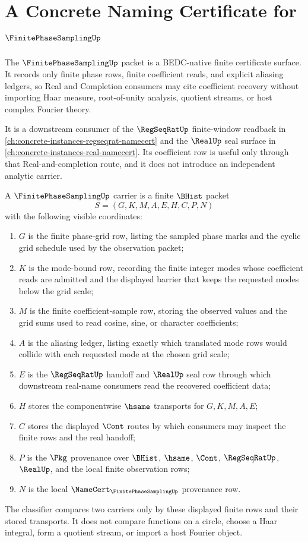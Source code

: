 \chapter{A Concrete Naming Certificate for $\FinitePhaseSamplingUp$}
\label{ch:concrete-instances-finite-phase-sampling-namecert}

The $\FinitePhaseSamplingUp$ packet is a BEDC-native finite certificate surface. It records only finite phase rows, finite coefficient reads, and explicit aliasing ledgers, so Real and Completion consumers may cite coefficient recovery without importing Haar measure, root-of-unity analysis, quotient streams, or host complex Fourier theory.

It is a downstream consumer of the $\RegSeqRatUp$ finite-window readback in \autoref{ch:concrete-instances-regseqrat-namecert} and the $\RealUp$ seal surface in \autoref{ch:concrete-instances-real-namecert}. Its coefficient row is useful only through that Real-and-completion route, and it does not introduce an independent analytic carrier.

\begin{definition}
\label{def:finite-phase-sampling-carrier}
A $\FinitePhaseSamplingUp$ carrier is a finite $\BHist$ packet
$$
S=(G,K,M,A,E,H,C,P,N)
$$
with the following visible coordinates:
\begin{enumerate}
\item $G$ is the finite phase-grid row, listing the sampled phase marks and the cyclic grid schedule used by the observation packet;
\item $K$ is the mode-bound row, recording the finite integer modes whose coefficient reads are admitted and the displayed barrier that keeps the requested modes below the grid scale;
\item $M$ is the finite coefficient-sample row, storing the observed values and the grid sums used to read cosine, sine, or character coefficients;
\item $A$ is the aliasing ledger, listing exactly which translated mode rows would collide with each requested mode at the chosen grid scale;
\item $E$ is the $\RegSeqRatUp$ handoff and $\RealUp$ seal row through which downstream real-name consumers read the recovered coefficient data;
\item $H$ stores the componentwise $\hsame$ transports for $G,K,M,A,E$;
\item $C$ stores the displayed $\Cont$ routes by which consumers may inspect the finite rows and the real handoff;
\item $P$ is the $\Pkg$ provenance over $\BHist$, $\hsame$, $\Cont$, $\RegSeqRatUp$, $\RealUp$, and the local finite observation rows;
\item $N$ is the local $\NameCert_{\FinitePhaseSamplingUp}$ provenance row.
\end{enumerate}
The classifier compares two carriers only by these displayed finite rows and their stored transports. It does not compare functions on a circle, choose a Haar integral, form a quotient stream, or import a host Fourier object.
\end{definition}

